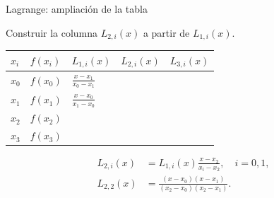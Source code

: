 \documentclass[main.tex]{subfiles}
\begin{document}
\begin{frame}[t]{Lagrange: ampliación de la tabla}
\par\noindent\begin{minipage}[t][10mm][t]{\textwidth}\small\strut Construir la columna $L_{2,i}(x)$ a partir de $L_{1,i}(x)$.\end{minipage}\par\nointerlineskip
\begin{minipage}[t]{\textwidth}\begingroup\scriptsize\setlength{\tabcolsep}{3pt}\begin{center}\begin{tabular}{|C{.065\textwidth}|C{.095\textwidth}|C{.19\textwidth}|C{.25\textwidth}|C{.25\textwidth}|}\hline
\rule[-2mm]{0pt}{6mm}$x_i$&$f(x_i)$&$L_{1,i}(x)$&$L_{2,i}(x)$&$L_{3,i}(x)$\\\hline
\rule[-2.5mm]{0pt}{8mm}$x_0$&$f(x_0)$&$\frac{x-x_1}{x_0-x_1}$&&\\\hline
\rule[-2.5mm]{0pt}{8mm}$x_1$&$f(x_1)$&$\frac{x-x_0}{x_1-x_0}$&&\\\hline
\rule[-2.5mm]{0pt}{8mm}$x_2$&$f(x_2)$&&&\\\hline
\rule[-2.5mm]{0pt}{8mm}$x_3$&$f(x_3)$&&&\\\hline
\end{tabular}\end{center}\endgroup\par
\end{minipage}\par\small\begin{align*}
L_{2,i}(x)&=L_{1,i}(x)\frac{x-x_2}{x_i-x_2},\quad i=0,1,\\
L_{2,2}(x)&=\frac{(x-x_0)(x-x_1)}{(x_2-x_0)(x_2-x_1)}.
\end{align*}
\end{frame}
\end{document}
